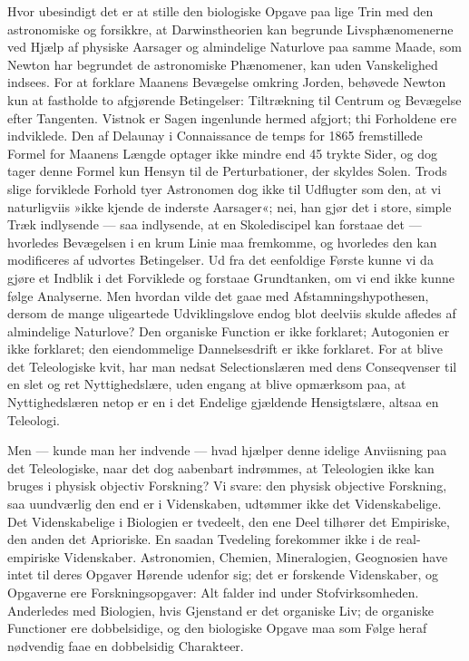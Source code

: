 \documentclass[12pt]{book}
\newcommand{\apage}[1]{\marginnote{\footnotesize\textit{[#1]}}}
\begin{document}
Hvor ubesindigt det er at stille den biologiske Opgave paa lige Trin med
den astronomiske og forsikkre, at Darwinstheorien kan begrunde
Livsphænomenerne ved Hjælp af physiske Aarsager og almindelige Naturlove
paa samme Maade, som Newton har begrundet de astronomiske Phænomener, kan
uden Vanskelighed indsees. For at forklare Maanens Bevægelse omkring
Jorden, behøvede Newton kun at fastholde to afgjørende Betingelser:
Tiltrækning til Centrum og Bevægelse efter \apage{201} Tangenten. Vistnok er Sagen
ingenlunde hermed afgjort; thi Forholdene ere indviklede. Den af Delaunay i
Connaissance de temps for 1865 fremstillede Formel for Maanens
Længde optager ikke mindre end 45 trykte Sider, og dog tager denne Formel
kun Hensyn til de Perturbationer, der skyldes Solen. Trods slige forviklede
Forhold tyer Astronomen dog ikke til Udflugter som den, at vi naturligviis
»ikke kjende de inderste Aarsager«; nei, han gjør det i store, simple Træk
indlysende --- saa indlysende, at en Skolediscipel kan forstaae det ---
hvorledes Bevægelsen i en krum Linie maa fremkomme, og hvorledes den kan
modificeres af udvortes Betingelser. Ud fra det eenfoldige Første kunne vi
da gjøre et Indblik i det Forviklede og forstaae Grundtanken, om vi end
ikke kunne følge Analyserne. Men hvordan vilde det gaae med
Afstamningshypothesen, dersom de mange uligeartede Udviklingslove endog
blot deelviis skulde afledes af almindelige Naturlove? Den organiske
Function er ikke forklaret; Autogonien er ikke forklaret; den eiendommelige
Dannelsesdrift er ikke forklaret. For at blive det Teleologiske kvit, har
man nedsat Selectionslæren med dens Conseqvenser til en slet og ret
Nyttighedslære, uden engang at blive opmærksom paa, at Nyttighedslæren
netop er en i det Endelige gjældende Hensigtslære, altsaa en Teleologi.

Men --- kunde man her indvende --- hvad hjælper denne idelige Anviisning
paa det Teleologiske, naar det dog aabenbart indrømmes, at Teleologien ikke
kan bruges i physisk objectiv Forskning? Vi svare: den \apage{202} physisk objective
Forskning, saa uundværlig den end er i Videnskaben, udtømmer ikke det
Videnskabelige. Det Videnskabelige i Biologien er tvedeelt, den ene Deel
tilhører det Empiriske, den anden det Aprioriske. En saadan Tvedeling
forekommer ikke i de real-empiriske Videnskaber. Astronomien, Chemien,
Mineralogien, Geognosien have intet til deres Opgaver Hørende udenfor sig;
det er forskende Videnskaber, og Opgaverne ere Forskningsopgaver: Alt
falder ind under Stofvirksomheden. Anderledes med Biologien, hvis Gjenstand
er det organiske Liv; de organiske Functioner ere dobbelsidige, og den
biologiske Opgave maa som Følge heraf nødvendig faae en dobbelsidig
Charakteer.
\end{document}
